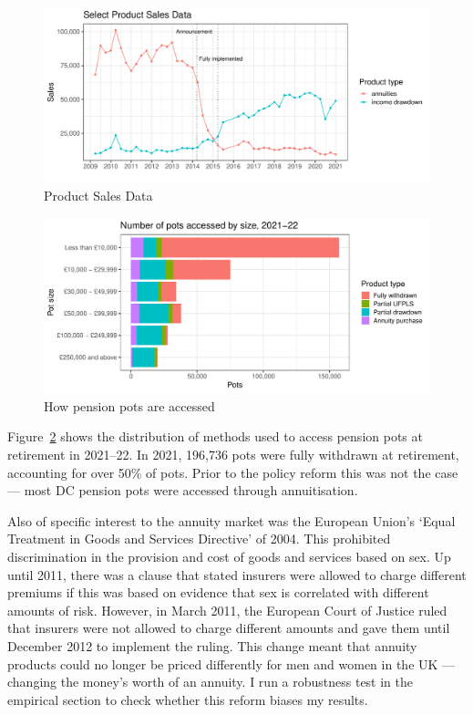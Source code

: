 \documentclass[12pt]{article}
\begin{document}
\begin{figure}[h]

  \centering
  \includegraphics[width=0.9\columnwidth]{figures/annuity_overtime.pdf}

  \caption{Product Sales Data}
  \label{fig:annovertime}
\end{figure}

\begin{figure}[h]

  \centering
  \includegraphics[width=0.9\columnwidth]{figures/annuity_pot_sizes.pdf}
  \caption[Caption for LOF]{How pension pots are accessed\protect\footnotemark}
  \label{fig:ann2122}
\end{figure}

Figure~\ref{fig:ann2122} shows the distribution of methods used to access pension pots
at retirement in 2021--22. In 2021, 196,736 pots were fully withdrawn at
retirement, accounting for over 50\% of pots. Prior to the policy reform this
was not the case --- most DC pension pots were accessed through
annuitisation.

Also of specific interest to the annuity market was the European Union's `Equal
Treatment in Goods and Services Directive' of 2004. This prohibited
discrimination in the provision and cost of goods and services based on sex. Up
until 2011, there was a clause that stated insurers were allowed to charge
different premiums if this was based on evidence that sex is correlated with
different amounts of risk. However, in March 2011, the European Court of Justice
ruled that insurers were not allowed to charge different amounts and gave them
until December 2012 to implement the ruling. This change meant that annuity
products could no longer be priced differently for men and women in the UK ---
changing the money's worth of an annuity. I run a robustness test in the
empirical section to check whether this reform biases my results.
\end{document}
